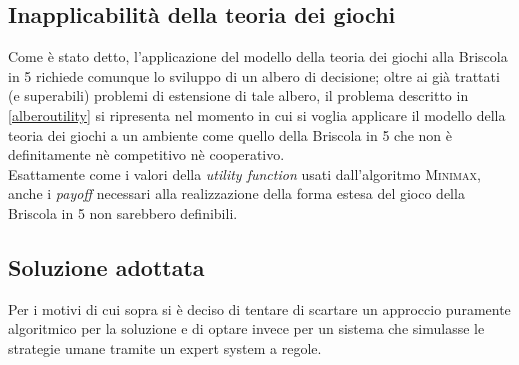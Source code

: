 \subsection{Inapplicabilità della teoria dei giochi}

Come è stato detto, l'applicazione del modello della teoria dei giochi alla Briscola in 5 richiede comunque lo sviluppo di un albero di decisione; oltre ai già trattati (e superabili) problemi di estensione di tale albero, il problema descritto in \ref{alberoutility} si ripresenta nel momento in cui si voglia applicare il modello della teoria dei giochi a un ambiente come quello della Briscola in 5 che non è definitamente nè competitivo nè cooperativo.\\
Esattamente come i valori della \emph{utility function} usati dall'algoritmo \textsc{Minimax}, anche i \emph{payoff} necessari alla realizzazione della forma estesa del gioco della Briscola in 5 non sarebbero definibili.



\subsection{Soluzione adottata}
Per i motivi di cui sopra si è deciso di tentare di scartare un approccio puramente algoritmico per la soluzione e di optare invece per un sistema che simulasse le strategie umane tramite un expert system a regole.
